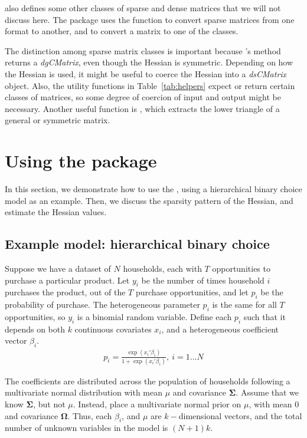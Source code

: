 \documentclass[article]{jss}\usepackage[]{graphicx}\usepackage[]{color}
\newcommand{\func}[1]{\code{#1}}
\newcommand{\class}[1]{\textsl{#1}}
\newcommand{\method}[1]{\func{#1}}
\newcommand{\Mat}[1]{\mathbf{#1}}
\begin{document}
 also defines some other classes of
sparse and dense matrices that we will not discuss here. The
 package uses the \func{as} function to convert sparse
matrices from one format to another, and to convert a 
 matrix to one of the  classes.

The distinction among sparse matrix classes is important because
's \method{hessian} method returns a
\class{dgCMatrix}, even though the Hessian is symmetric. Depending on how the
Hessian is used, it might be useful to coerce the Hessian into a
\class{dsCMatrix} object.  Also, the utility functions in Table~\ref{tab:helpers} expect or return certain classes of matrices, so
some degree of coercion of input and output might be
necessary. Another useful  function is \func{tril}, which
extracts the lower triangle of a general or symmetric matrix.


\section[Using the package]{Using the package}\label{sec:using}

In this section, we demonstrate how to use the ,
using a hierarchical binary choice model as an example.  Then, we
discuss the sparsity pattern of the Hessian, and estimate the Hessian values.

\subsection[Example: hierarchical binary choice]{Example model: hierarchical binary choice}\label{sec:example}

Suppose we have a dataset of $N$ households, each with $T$
 opportunities to purchase a particular product.  Let $y_i$ be the
 number of times household $i$ purchases the product, out of the $T$
 purchase opportunities, and let $p_i$ be the probability of
 purchase.  The heterogeneous parameter $p_i$ is the same for all $T$
 opportunities, so $y_i$ is a binomial random variable.  Define each $p_i$ such that it depends on both $k$ continuous covariates
 $x_i$, and a heterogeneous coefficient vector $\beta_i$.
\begin{align}
  p_i=\frac{\exp(x_i'\beta_i)}{1+\exp(x_i'\beta_i)},~i=1 ... N
\end{align}

The coefficients are distributed across the population of households
following a multivariate normal distribution with mean $\mu$ and
covariance $\Mat{\Sigma}$.   Assume that we know $\Mat{\Sigma}$, but not $\mu$.
Instead, place a multivariate normal prior on $\mu$, with mean $0$ and
covariance $\Mat{\Omega}$.  Thus, each $\beta_i$, and $\mu$ are
$k-$dimensional vectors, and the total number of unknown variables in the model is $(N+1)k$.
\end{document}
